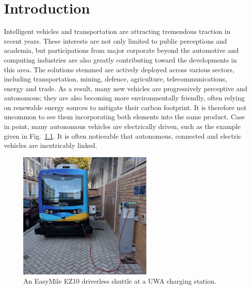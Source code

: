 \chapter{Introduction}

\ifpdf
\graphicspath{{Chapter1/Figs/Raster/}{Chapter1/Figs/PDF/}{Chapter1/Figs/}}
\else
\graphicspath{{Chapter1/Figs/Vector/}{Chapter1/Figs/}}
\fi


Intelligent vehicles and transportation are attracting tremendous traction in recent years. These interests are not only limited to public perceptions and academia, but participations from major corporate beyond the automotive and computing industries are also greatly contributing toward the developments in this area. The solutions stemmed are actively deployed across various sectors, including transportation, mining, defence, agriculture, telecommunications, energy and trade. As a result, many new vehicles are progressively perceptive and autonomous; they are also becoming more environmentally friendly, often relying on renewable energy sources to mitigate their carbon footprint. It is therefore not uncommon to see them incorporating both elements into the same product. Case in point, many autonomous vehicles are electrically driven, such as the example given in Fig.~\ref{fig:1:bus}. It is often noticeable that autonomous, connected and electric vehicles are inextricably linked.

\begin{figure}[ht] 
	\centering    
	\includegraphics[width=0.6\textwidth]{bus}
	\caption{An EasyMile EZ10 driverless shuttle at a UWA charging station.}
	\label{fig:1:bus}
\end{figure}

